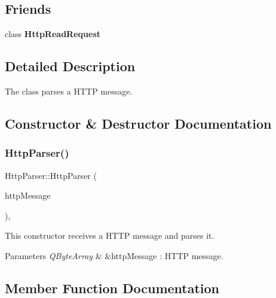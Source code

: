 \subsection*{Friends}
\begin{DoxyCompactItemize}
\item 
\mbox{\label{class_http_parser_a4d54f5003e07e218070a449c22a52c7c}} 
class {\bfseries Http\+Read\+Request}
\end{DoxyCompactItemize}


\subsection{Detailed Description}
The class parses a H\+T\+TP message. 

\subsection{Constructor \& Destructor Documentation}
\mbox{\label{class_http_parser_a91e6c1876337b53694347476f277d1a2}} 
\subsubsection{\texorpdfstring{Http\+Parser()}{HttpParser()}}
{\footnotesize\ttfamily Http\+Parser\+::\+Http\+Parser (\begin{DoxyParamCaption}\item[{Q\+Byte\+Array \&}]{http\+Message }\end{DoxyParamCaption})\hspace{0.3cm}{\ttfamily [inline]}, {\ttfamily [explicit]}}



This constructor receives a H\+T\+TP message and parses it. 


\begin{DoxyParams}{Parameters}
{\em Q\+Byte\+Array} & \&http\+Message \+: H\+T\+TP message. \\
\hline
\end{DoxyParams}


\subsection{Member Function Documentation}
\mbox{\label{class_http_parser_abeee6e30f6494121010bc5498b162870}} 
